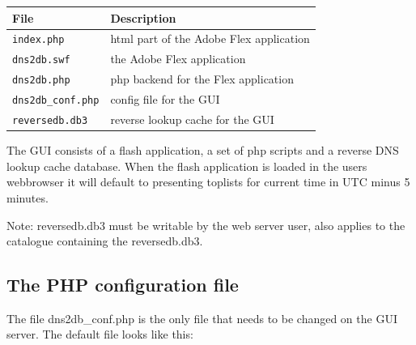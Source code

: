 \documentclass[a4paper]{article}
\begin{document}
\begin{center}
    \begin{tabular}{ | l | p{7cm} |}
    \hline
    \textbf{File} & \textbf{Description}  \\ \hline
    \verb|index.php|&                    html part of the Adobe Flex application\\ \hline

    \verb|dns2db.swf|&                  the Adobe Flex application\\ \hline

    \verb|dns2db.php| &           php backend for the Flex application\\ \hline

    \verb|dns2db_conf.php| &      config file for the GUI\\ \hline

    \verb|reversedb.db3|     &     reverse lookup cache for the GUI\\ \hline

  

    \end{tabular}
\end{center}
	


The GUI consists of a flash application, a set of php scripts and a reverse DNS 
lookup cache database. When the flash application is loaded in the users webbrowser 
it will default to presenting toplists for current time in UTC minus 5 minutes.

Note: reversedb.db3 must be writable by the web server user, also applies to 
the catalogue containing the reversedb.db3.

\subsection{The PHP configuration file}
The file dns2db\_conf.php is the only file that needs to be changed on the GUI server.
The default file looks like this:
\end{document}
